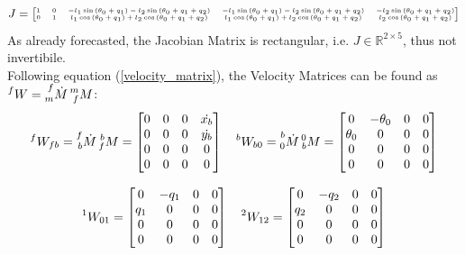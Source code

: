 \documentclass[a4paper,12pt,oneside]{report}
\begin{document}
\begin{equation}
  \begin{tiny}
  J=\begin{bmatrix}
    1&0&-l_1\sin{(\theta_0+q_1)}-l_2\sin{(\theta_0+q_1+q_2)}&-l_1\sin{(\theta_0+q_1)}-l_2\sin{(\theta_0+q_1+q_2)}&-l_2\sin{(\theta_0+q_1+q_2)}\\
    0&1&l_1\cos{(\theta_0+q_1)}+l_2\cos{(\theta_0+q_1+q_2)}&l_1\cos{(\theta_0+q_1)}+l_2\cos{(\theta_0+q_1+q_2)}&l_2\cos{(\theta_0+q_1+q_2)}
  \end{bmatrix}
\end{tiny}
\end{equation}
As already forecasted, the Jacobian Matrix is rectangular, i.e. $J\in \mathbb{R}^{2\times5}$, thus not invertibile.\\

Following equation (\ref{velocity_matrix}), the Velocity Matrices can be found as $\prescript{f}{}{W}=\prescript{f}{m}{\dot{M}}\prescript{m}{f}{M}$:
\begin{equation}
  \begin{array}{c}
    \prescript{f}{}{W_{fb}}=\prescript{f}{b}{\dot{M}}\prescript{b}{f}{M}=\begin{bmatrix}
      0&0&0&\dot{x_b}\\
      0&0&0&\dot{y_b}\\
      0&0&0&0\\
      0&0&0&0
    \end{bmatrix} \quad
    \prescript{b}{}{W_{b0}}=\prescript{b}{0}{\dot{M}}\prescript{0}{b}{M}=\begin{bmatrix}
      0&-\theta_0&0&0\\
      \theta_0&0&0&0\\
      0&0&0&0\\
      0&0&0&0
    \end{bmatrix}\\ \\
    \prescript{1}{}{W_{01}}=\begin{bmatrix}
      0&-q_1&0&0\\
      q_1&0&0&0\\
      0&0&0&0\\
      0&0&0&0
    \end{bmatrix} \quad
    \prescript{2}{}{W_{12}}=\begin{bmatrix}
      0&-q_2&0&0\\
      q_2&0&0&0\\
      0&0&0&0\\
      0&0&0&0
    \end{bmatrix}
  \end{array}
\end{equation}
\end{document}

